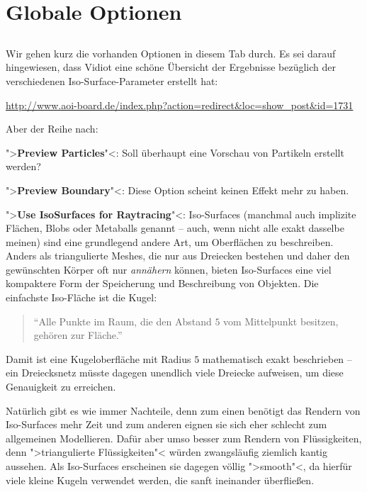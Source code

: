 \documentclass[10pt,DIV=14,a4paper]{scrartcl}
\begin{document}



\pagebreak
\section{Globale Optionen}

\subsection{}
Wir gehen kurz die vorhanden Optionen in diesem Tab durch. Es sei darauf
hingewiesen, dass Vidiot eine schöne Übersicht der Ergebnisse bezüglich
der verschiedenen Iso-Surface-Parameter erstellt hat:

\url{http://www.aoi-board.de/index.php?action=redirect&loc=show_post&id=1731}

Aber der Reihe nach:

\itA
	\item ">\textbf{Preview Particles}"<: Soll überhaupt eine Vorschau
	von Partikeln erstellt werden?

	\item ">\textbf{Preview Boundary}"<: Diese Option scheint keinen
	Effekt mehr zu haben.

	\item ">\textbf{Use IsoSurfaces for Raytracing}"<: Iso-Surfaces
	(manchmal auch implizite Flächen, Blobs oder Metaballs genannt --
	auch, wenn nicht alle exakt dasselbe meinen) sind eine grundlegend
	andere Art, um Oberflächen zu beschreiben. Anders als triangulierte
	Meshes, die nur aus Dreiecken bestehen und daher den gewünschten
	Körper oft nur \emph{annähern} können, bieten Iso-Surfaces eine viel
	kompaktere Form der Speicherung und Beschreibung von Objekten. Die
	einfachste Iso-Fläche ist die Kugel:

	\begin{quote}
		"`Alle Punkte im Raum, die den Abstand $5$ vom Mittelpunkt
		besitzen, gehören zur Fläche."'
	\end{quote}

	Damit ist eine Kugeloberfläche mit Radius $5$ mathematisch exakt
	beschrieben -- ein Dreiecksnetz müsste dagegen unendlich viele
	Dreiecke aufweisen, um diese Genauigkeit zu erreichen.

	Natürlich gibt es wie immer Nachteile, denn zum einen benötigt das
	Rendern von Iso-Surfaces mehr Zeit und zum anderen eignen sie sich
	eher schlecht zum allgemeinen Modellieren. Dafür aber umso besser
	zum Rendern von Flüssigkeiten, denn ">triangulierte Flüssigkeiten"<
	würden zwangsläufig ziemlich kantig aussehen. Als Iso-Surfaces
	erscheinen sie dagegen völlig ">smooth"<, da hierfür viele kleine
	Kugeln verwendet werden, die sanft ineinander überfließen.
\end{document}

